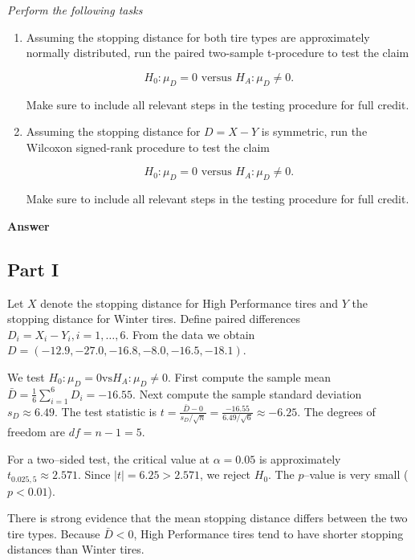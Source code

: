 \documentclass[letterpaper]{article}
\begin{document}
		\medskip
		
		\emph{Perform the following tasks}
		
		\begin{enumerate}
			
			\item[i] Assuming the stopping distance for both tire types are approximately normally distributed, run the paired two-sample t-procedure to test the claim
			
			\[
			H_0 : \mu_D = 0 
			\text{ versus } 
			H_A : \mu_D \neq 0 .
			\]
			
			Make sure to include all relevant steps in the testing procedure for full credit.
			
			\item[ii] Assuming the stopping distance for $D = X - Y$ is symmetric, run the Wilcoxon signed-rank procedure to test the claim
			
			\[
			H_0 : \mu_D = 0 
			\text{ versus } 
			H_A : \mu_D \neq 0 .
			\]
			
			Make sure to include all relevant steps in the testing procedure for full credit.
			
		\end{enumerate}
		
		
		\textbf{Answer}
		
		
		
		
		\subsection{Part I}
		Let $X$ denote the stopping distance for High Performance tires and $Y$ the stopping distance for Winter tires. Define paired differences
		$
		D_i = X_i - Y_i,  i=1,\dots,6.
		$
		From the data we obtain
		$
		D = (-12.9,-27.0,-16.8,-8.0,-16.5,-18.1).
		$
		
		We test
		$
		H_0:\mu_D=0
		\text{vs} 
		H_A:\mu_D\ne 0.
		$ First compute the sample mean
		$
		\bar D=\frac{1}{6}\sum_{i=1}^6 D_i
		= -16.55.
		$ Next compute the sample standard deviation
		$
		s_D \approx 6.49.
		$ The test statistic is
		$
		t=\frac{\bar D-0}{s_D/\sqrt{n}}
		=\frac{-16.55}{6.49/\sqrt{6}}
		\approx -6.25.
		$ The degrees of freedom are
		$
		df=n-1=5.
		$
		
		For a two–sided test, the critical value at $\alpha=0.05$ is approximately
		$
		t_{0.025,5}\approx 2.571.$ Since $|t|=6.25>2.571$, we reject $H_0$. The $p$–value is very small ($p<0.01$).
		
		There is strong evidence that the mean stopping distance differs between the two tire types. Because $\bar D<0$, High Performance tires tend to have shorter stopping distances than Winter tires.
		
\end{document}
